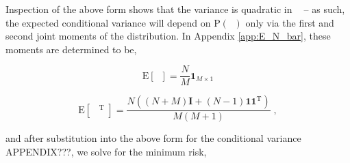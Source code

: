 \documentclass[12pt]{report}
\DeclareMathOperator{\yrm}{\mathrm{y}}
\DeclareMathOperator{\nrm}{\mathrm{n}}
\DeclareMathOperator{\nbarrm}{\bar{\bm{\mathrm{n}}}}
\begin{document}
%
%
%
%
%

Inspection of the above form shows that the variance is quadratic in $\nbarrm$ -- as such, the expected conditional variance will depend on $\text{P}(\nbarrm)$ only via the first and second joint moments of the distribution. In Appendix \ref{app:E_N_bar}, these moments are determined to be,

\begin{equation}
\text{E}[\nbarrm] = \frac{N}{M} \bm{1}_{M \times 1}
\end{equation}

\begin{equation}
\text{E}[\nbarrm \nbarrm^\text{T}] = \frac{N \left( (N+M)\textbf{I} + (N-1)\bm{1}\bm{1}^\text{T} \right)}{M(M+1)} \;,
\end{equation}

and after substitution into the above form for the conditional variance APPENDIX???, we solve for the minimum risk,
\end{document}
